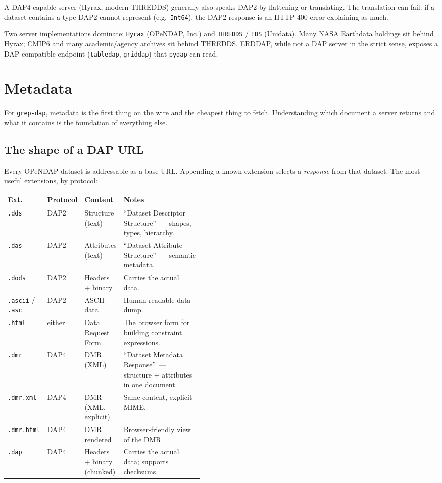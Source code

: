 \documentclass[11pt]{article}
\begin{document}
A DAP4-capable server (Hyrax, modern THREDDS) generally also speaks
DAP2 by flattening or translating. The translation can fail: if a
dataset contains a type DAP2 cannot represent (e.g.\ \texttt{Int64}),
the DAP2 response is an HTTP 400 error explaining as much.

Two server implementations dominate:
\texttt{Hyrax} (OPeNDAP, Inc.) and \texttt{THREDDS} / \texttt{TDS}
(Unidata). Many NASA Earthdata holdings sit behind Hyrax; CMIP6 and
many academic/agency archives sit behind THREDDS. ERDDAP, while not a
DAP server in the strict sense, exposes a DAP-compatible endpoint
(\texttt{tabledap}, \texttt{griddap}) that \texttt{pydap} can read.

\section{Metadata}

For \texttt{grep-dap}, metadata is the first thing on the wire and the
cheapest thing to fetch. Understanding which document a server returns
and what it contains is the foundation of everything else.

\subsection{The shape of a DAP URL}

Every OPeNDAP dataset is addressable as a base URL. Appending a known
extension selects a \emph{response} from that dataset. The most useful
extensions, by protocol:

\begin{center}
\begin{tabular}{@{}lllp{0.45\linewidth}@{}}
\toprule
Ext. & Protocol & Content & Notes \\
\midrule
\texttt{.dds}      & DAP2 & Structure (text)              & ``Dataset Descriptor Structure''~--- shapes, types, hierarchy. \\
\texttt{.das}      & DAP2 & Attributes (text)             & ``Dataset Attribute Structure''~--- semantic metadata. \\
\texttt{.dods}     & DAP2 & Headers + binary              & Carries the actual data. \\
\texttt{.ascii} / \texttt{.asc} & DAP2 & ASCII data        & Human-readable data dump. \\
\texttt{.html}     & either & Data Request Form           & The browser form for building constraint expressions. \\
\texttt{.dmr}      & DAP4 & DMR (XML)                     & ``Dataset Metadata Response''~--- structure + attributes in one document. \\
\texttt{.dmr.xml}  & DAP4 & DMR (XML, explicit)           & Same content, explicit MIME. \\
\texttt{.dmr.html} & DAP4 & DMR rendered                  & Browser-friendly view of the DMR. \\
\texttt{.dap}      & DAP4 & Headers + binary (chunked)    & Carries the actual data; supports checksums. \\
\bottomrule
\end{tabular}
\end{center}
\end{document}
